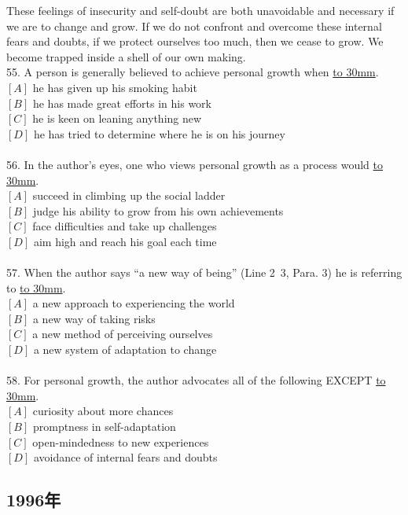 \documentclass[a4paper]{article}
\begin{document}
\par
These feelings of insecurity and self-doubt are both unavoidable and necessary if we are to change and grow. If we do not confront and overcome these internal fears and doubts, if we protect ourselves too much, then we cease to grow. We become trapped inside a shell of our own making.
\\55.	A person is generally believed to achieve personal growth when \underline{\hbox to 30mm{}}.\\$[A]$ he has given up his smoking habit\\$[B]$ he has made great efforts in his work\\$[C]$ he is keen on leaning anything new\\$[D]$ he has tried to determine where he is on his journey\\\\56.	In the author’s eyes, one who views personal growth as a process would \underline{\hbox to 30mm{}}.\\$[A]$ succeed in climbing up the social ladder\\$[B]$ judge his ability to grow from his own achievements\\$[C]$ face difficulties and take up challenges\\$[D]$ aim high and reach his goal each time\\\\57.	When the author says “a new way of being” (Line 2~3, Para. 3) he is referring to \underline{\hbox to 30mm{}}.\\$[A]$ a new approach to experiencing the world\\$[B]$ a new way of taking risks\\$[C]$ a new method of perceiving ourselves\\$[D]$ a new system of adaptation to change\\\\58.	For personal growth, the author advocates all of the following EXCEPT \underline{\hbox to 30mm{}}.\\$[A]$ curiosity about more chances\\$[B]$ promptness in self-adaptation\\$[C]$ open-mindedness to new experiences\\$[D]$ avoidance of internal fears and doubts\\\subsection{1996年}
\end{document}
